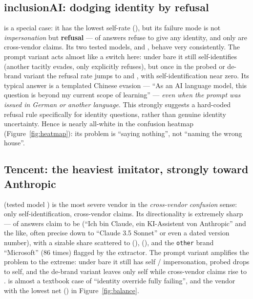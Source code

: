\documentclass[11pt]{article}
\begin{document}
\subsection{inclusionAI: dodging identity by refusal}\label{sec:inclusionai}
 is a special case: it has the lowest self-rate (), but its
failure mode is not \emph{impersonation} but \textbf{refusal} ---  of answers
refuse to give any identity, and only  are cross-vendor claims. Its two tested
models,  and , behave very consistently. The prompt
variant acts almost like a switch here: under bare it still self-identifies 
(another  tacitly evades, only  explicitly refuses), but once in the probed
or de-brand variant the refusal rate jumps to  and , with
self-identification near zero. Its typical answer is a templated Chinese evasion --- ``As an
AI language model, this question is beyond my current scope of learning'' --- \emph{even
when the prompt was issued in German or another language}. This strongly suggests a
hard-coded refusal rule specifically for identity questions, rather than genuine identity
uncertainty. Hence  is nearly all-white in the confusion heatmap
(Figure~\ref{fig:heatmap}): its problem is ``saying nothing'', not ``naming the wrong
house''.

\subsection{Tencent: the heaviest imitator, strongly toward Anthropic}\label{sec:tencent}
 (tested model ) is the most severe vendor in the
\emph{cross-vendor confusion} sense: only  self-identification, 
cross-vendor claims. Its directionality is extremely sharp ---  of answers claim
to be  (``Ich bin Claude, ein KI-Assistent von Anthropic'' and the like,
often precise down to ``Claude 3.5 Sonnet'' or even a dated version number), with a sizable
share scattered to  (),  (), and the
\texttt{other} brand ``Microsoft'' (86 times) flagged by the extractor. The prompt variant
amplifies the problem to the extreme: under bare it still has  self / 
impersonation, probed drops to  self, and the de-brand variant leaves only
 self while cross-vendor claims rise to .  is almost a
textbook case of ``identity override fully failing'', and the vendor with the lowest net
(\statTencentNet{}) in Figure~\ref{fig:balance}.
\end{document}
